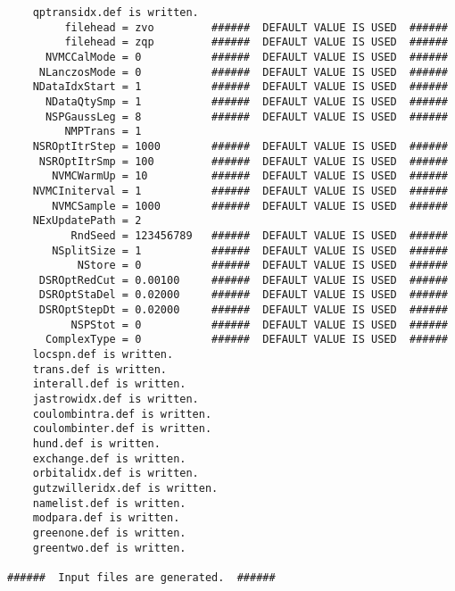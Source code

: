 \begin{verbatim}
    qptransidx.def is written.
         filehead = zvo         ######  DEFAULT VALUE IS USED  ######
         filehead = zqp         ######  DEFAULT VALUE IS USED  ######
      NVMCCalMode = 0           ######  DEFAULT VALUE IS USED  ######
     NLanczosMode = 0           ######  DEFAULT VALUE IS USED  ######
    NDataIdxStart = 1           ######  DEFAULT VALUE IS USED  ######
      NDataQtySmp = 1           ######  DEFAULT VALUE IS USED  ######
      NSPGaussLeg = 8           ######  DEFAULT VALUE IS USED  ######
         NMPTrans = 1         
    NSROptItrStep = 1000        ######  DEFAULT VALUE IS USED  ######
     NSROptItrSmp = 100         ######  DEFAULT VALUE IS USED  ######
       NVMCWarmUp = 10          ######  DEFAULT VALUE IS USED  ######
    NVMCIniterval = 1           ######  DEFAULT VALUE IS USED  ######
       NVMCSample = 1000        ######  DEFAULT VALUE IS USED  ######
    NExUpdatePath = 2         
          RndSeed = 123456789   ######  DEFAULT VALUE IS USED  ######
       NSplitSize = 1           ######  DEFAULT VALUE IS USED  ######
           NStore = 0           ######  DEFAULT VALUE IS USED  ######
     DSROptRedCut = 0.00100     ######  DEFAULT VALUE IS USED  ######
     DSROptStaDel = 0.02000     ######  DEFAULT VALUE IS USED  ######
     DSROptStepDt = 0.02000     ######  DEFAULT VALUE IS USED  ######
          NSPStot = 0           ######  DEFAULT VALUE IS USED  ######
      ComplexType = 0           ######  DEFAULT VALUE IS USED  ######
    locspn.def is written.
    trans.def is written.
    interall.def is written.
    jastrowidx.def is written.
    coulombintra.def is written.
    coulombinter.def is written.
    hund.def is written.
    exchange.def is written.
    orbitalidx.def is written.
    gutzwilleridx.def is written.
    namelist.def is written.
    modpara.def is written.
    greenone.def is written.
    greentwo.def is written.

######  Input files are generated.  ######
\end{verbatim}
\normalsize

